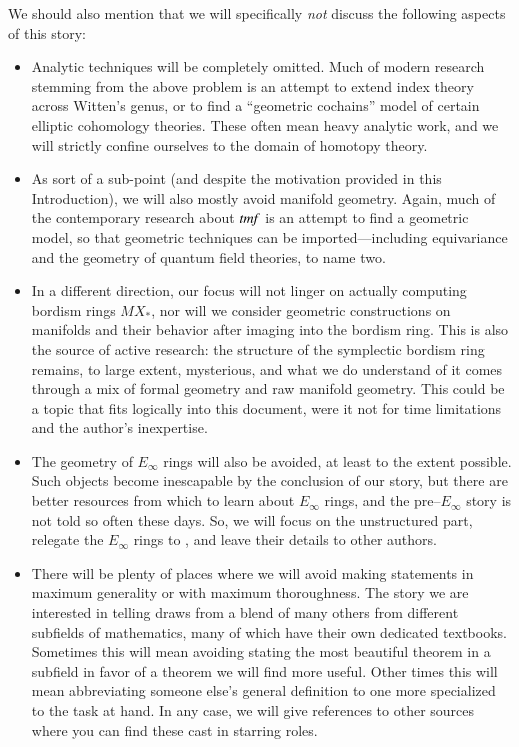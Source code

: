 We should also mention that we will specifically \emph{not} discuss the following aspects of this story:
\begin{itemize}
\item Analytic techniques will be completely omitted.  Much of modern research stemming from the above problem is an attempt to extend index theory across Witten's genus, or to find a ``geometric cochains'' model of certain elliptic cohomology theories.  These often mean heavy analytic work, and we will strictly confine ourselves to the domain of homotopy theory.
\item As sort of a sub-point (and despite the motivation provided in this Introduction), we will also mostly avoid manifold geometry.  Again, much of the contemporary research about $\mathit{tmf}$ is an attempt to find a geometric model, so that geometric techniques can be imported---including equivariance and the geometry of quantum field theories, to name two.
\item In a different direction, our focus will not linger on actually computing bordism rings $MX_*$, nor will we consider geometric constructions on manifolds and their behavior after imaging into the bordism ring.  This is also the source of active research: the structure of the symplectic bordism ring remains, to large extent, mysterious, and what we do understand of it comes through a mix of formal geometry and raw manifold geometry.  This could be a topic that fits logically into this document, were it not for time limitations and the author's inexpertise.
\item The geometry of $E_\infty$ rings will also be avoided, at least to the extent possible.  Such objects become inescapable by the conclusion of our story, but there are better resources from which to learn about $E_\infty$ rings, and the pre--$E_\infty$ story is not told so often these days.  So, we will focus on the unstructured part, relegate the $E_\infty$ rings to , and leave their details to other authors.
\item There will be plenty of places where we will avoid making statements in maximum generality or with maximum thoroughness.  The story we are interested in telling draws from a blend of many others from different subfields of mathematics, many of which have their own dedicated textbooks.  Sometimes this will mean avoiding stating the most beautiful theorem in a subfield in favor of a theorem we will find more useful.  Other times this will mean abbreviating someone else's general definition to one more specialized to the task at hand.  In any case, we will give references to other sources where you can find these cast in starring roles.
\end{itemize}

